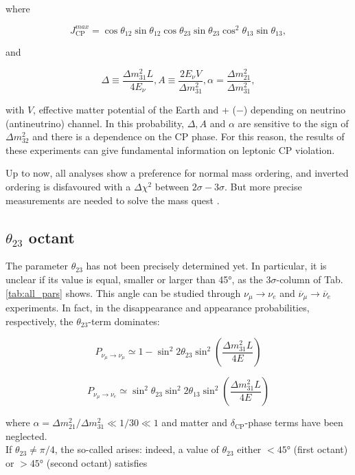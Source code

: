 where 

\begin{equation}
    J^{max}_{\text{CP}} = \cos \theta_{12}\sin \theta_{12} \cos \theta_{23}\sin \theta_{23} \cos^2 \theta_{13} \sin \theta_{13},
\end{equation}

and 

\begin{equation}
    \Delta \equiv \frac{\Delta m^2_{31}L}{4E_\nu}, A \equiv \frac{2E_\nu V}{\Delta m^2_{31}}, \alpha = \frac{\Delta m^2_{21}}{\Delta m^2_{31}},
\end{equation}

with $V$, effective matter potential of the Earth and + ($-$) depending on neutrino (antineutrino) channel. In this probability, $\Delta, A$ and $\alpha$ are sensitive to the sign of $\Delta m^2_{32}$ and there is a dependence on the CP phase. For this reason, the results of these experiments can give fundamental information on leptonic CP violation.

Up to now, all analyses show a preference for normal mass ordering, and inverted ordering is disfavoured with a $\Delta \chi^2$ between $2\sigma - 3\sigma$. But more precise measurements are needed to solve the mass quest \cite{pdg:2022ynf}. 

\subsection{$\theta_{23}$ octant}%
The parameter $\theta_{23}$ has not been precisely determined yet. In particular, it is unclear if its value is equal, smaller or larger than 45°, as the $3\sigma$-column of Tab. \ref{tab:all_pars} shows.
This angle can be studied through $\nu_\mu \rightarrow \nu_e$ and $\overline{\nu}_\mu \rightarrow \overline{\nu}_e$ experiments. In fact, in the disappearance and appearance probabilities, respectively, the $\theta_{23}$-term dominates: 

\begin{equation}
P_{\nu_\mu \rightarrow \nu_\mu} \simeq 1 - \sin^2 2\theta_{23}\sin^2 \left(\frac{\Delta m^2_{31}L}{4E}\right)
\end{equation}

\begin{equation}
P_{\nu_\mu \rightarrow \nu_e} \simeq \sin^2 \theta_{23}\sin^2 2\theta_{13}\sin^2 \left(\frac{\Delta m^2_{31}L}{4E}\right)
\end{equation}

where $\alpha = \Delta m^2_{21}/\Delta m^2_{31} \ll 1/30 \ll 1$ and matter and $\delta_{\text{CP}}$-phase terms have been neglected. \cite{theta-23-first}\\
If $\theta_{23} \neq \pi/4$, the so-called  arises: indeed, a value of $\theta_{23}$ either $< 45$° (first octant) or $> 45$° (second octant) satisfies

